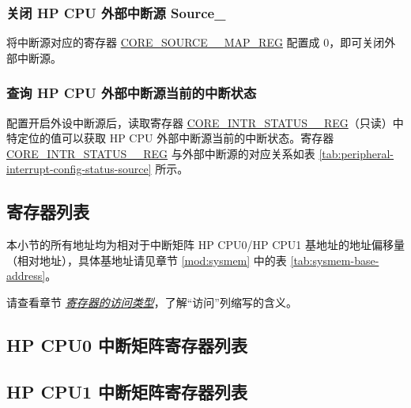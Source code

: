 \documentclass[main\_\_CN.tex]{subfiles}
\begin{document}
\subsubsection{关闭 HP CPU 外部中断源 Source\_}

将中断源对应的寄存器 \hyperref[regdesc:CORE0SOURCEregindexYMAPREG]{CORE\_SOURCE\_\_MAP\_REG} 配置成 0，即可关闭外部中断源。

\subsubsection{查询 HP CPU 外部中断源当前的中断状态}
配置开启外设中断源后，读取寄存器 \hyperref[fielddesc:CORE0INTRSTATUS0]{CORE\_INTR\_STATUS\_\_REG}（只读）中特定位的值可以获取 HP CPU 外部中断源当前的中断状态。寄存器 \hyperref[fielddesc:CORE0INTRSTATUS0]{CORE\_INTR\_STATUS\_\_REG} 与外部中断源的对应关系如表 \ref{tab:peripheral-interrupt-config-status-source} 所示。




\newpage
\hypertarget{intmtrx--reg-summ}{}
\begin{landscape}
\section{寄存器列表}
\label{sec:{intmtrx--reg-summ}}

本小节的所有地址均为相对于中断矩阵 HP CPU0/HP CPU1 基地址的地址偏移量（相对地址），具体基地址请见章节 \ref{mod:sysmem} \textit{} 中的表 \ref{tab:sysmem-base-address}。


请查看章节 \hyperref[glossary-access-types]{\textit{寄存器的访问类型}}，了解“访问”列缩写的含义。

\subsection{HP CPU0 中断矩阵寄存器列表}
\label{sec: cpu0-intmtrx-reg-summ}



\subsection{HP CPU1 中断矩阵寄存器列表}
\label{sec: cpu1-intmtrx-reg-summ}


\end{landscape}
\end{document}
